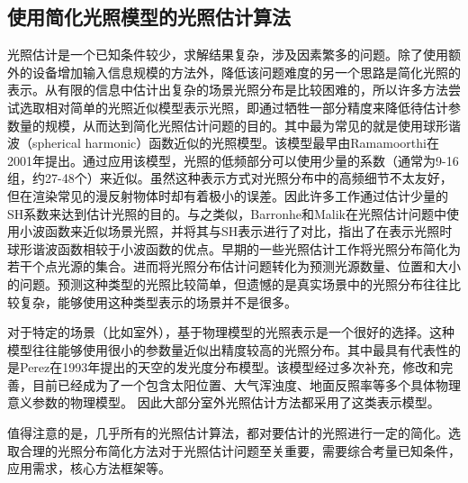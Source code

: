 \subsection{使用简化光照模型的光照估计算法}
光照估计是一个已知条件较少，求解结果复杂，涉及因素繁多的问题。除了使用额外的设备增加输入信息规模的方法外，降低该问题难度的另一个思路是简化光照的表示。从有限的信息中估计出复杂的场景光照分布是比较困难的，所以许多方法尝试选取相对简单的光照近似模型表示光照，即通过牺牲一部分精度来降低待估计参数量的规模，从而达到简化光照估计问题的目的。其中最为常见的就是使用球形谐波（spherical harmonic）函数近似的光照模型。该模型最早由Ramamoorthi\cite{ramamoorthi2001efficient}在2001年提出。通过应用该模型，光照的低频部分可以使用少量的系数（通常为9-16组，约27-48个）来近似。虽然这种表示方式对光照分布中的高频细节不太友好，但在渲染常见的漫反射物体时却有着极小的误差。因此许多工作\cite{ramamoorthi2001signal,kemelmacher20113d,garrido2013reconstructing,knorr2014real,li2014intrinsic,barron2015shape}通过估计少量的SH系数来达到估计光照的目的。与之类似，Barronhe和Malik\cite{okabe2004spherical}在光照估计问题中使用小波函数来近似场景光照，并将其与SH表示进行了对比，指出了在表示光照时球形谐波函数相较于小波函数的优点。早期的一些光照估计工作\cite{sato1999acquiring,  panagopoulos2011illumination, wang2002estimation, li2003multiple, sato2003illumination}将光照分布简化为若干个点光源的集合。进而将光照分布估计问题转化为预测光源数量、位置和大小的问题。预测这种类型的光照比较简单，但遗憾的是真实场景中的光照分布往往比较复杂，能够使用这种类型表示的场景并不是很多。

对于特定的场景（比如室外），基于物理模型的光照表示是一个很好的选择。这种模型往往能够使用很小的参数量近似出精度较高的光照分布。其中最具有代表性的是Perez\cite{perez1993all}在1993年提出的天空的发光度分布模型。该模型经过多次补充，修改和完善\cite{nishita1996display, sirai1993display,preetham1999practical,raab2008unbiased,hosek2012analytic, hovsekhovsek2013adding}，目前已经成为了一个包含太阳位置、大气浑浊度、地面反照率等多个具体物理意义参数的物理模型。
因此大部分室外光照估计方法\cite{lalonde2008does, lalonde2010sun, lalonde2012estimating, sunkavalli2008color}都采用了这类表示模型。

值得注意的是，几乎所有的光照估计算法，都对要估计的光照进行一定的简化。选取合理的光照分布简化方法对于光照估计问题至关重要，需要综合考量已知条件，应用需求，核心方法框架等。


